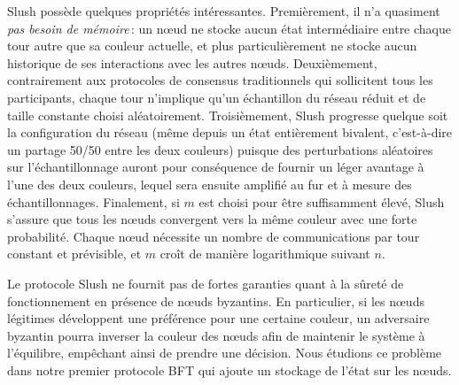\documentclass[letterpaper,twocolumn,10pt]{article}
\newcommand{\tronly}[2]{#1}
\theoremstyle{definition}
\begin{document}

Slush possède quelques propriétés intéressantes. Premièrement, il n'a quasiment \emph{pas besoin de mémoire}\,: un nœud ne
stocke aucun état intermédiaire entre chaque tour autre que sa couleur actuelle, et plus particulièrement ne stocke
aucun historique de ses interactions avec les autres nœuds. Deuxièmement, contrairement aux protocoles de consensus
traditionnels qui sollicitent tous les participants, chaque tour n'implique qu'un échantillon du réseau réduit et de
taille constante choisi aléatoirement. Troisièmement, Slush progresse quelque soit la configuration du réseau (même
depuis un état entièrement bivalent, c'est-à-dire un partage 50/50 entre les deux couleurs) puisque des perturbations aléatoires
sur l'échantillonnage auront pour conséquence de fournir un léger avantage à l'une des deux couleurs, lequel sera ensuite
amplifié au fur et à mesure des échantillonnages.
Finalement, si $m$ est choisi pour être suffisamment élevé, Slush s'assure que tous les nœuds convergent vers la
même couleur avec une forte probabilité. Chaque nœud nécessite un nombre de communications par tour constant et   %
prévisible, et $m$ croît de manière logarithmique suivant $n$.

\tronly{

Le protocole Slush ne fournit pas de fortes garanties quant à la sûreté de fonctionnement en présence de nœuds
byzantins. En particulier, si les nœuds légitimes développent une préférence pour une certaine couleur, un adversaire
byzantin pourra inverser la couleur des nœuds afin de maintenir le système à l'équilibre, empêchant ainsi de prendre une
décision. Nous étudions ce problème dans notre premier protocole BFT qui ajoute un stockage de l'état sur les nœuds.
}{
Nous examinons ensuite la manière de fournir à Slush une tolérance aux comporements byzantins.
}
\end{document}
